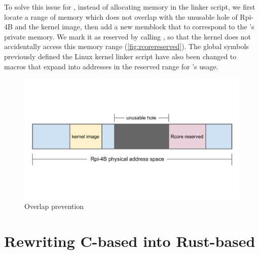 To solve this issue for \rustsec{}, instead of allocating memory in the linker
script, we first locate a range of memory which does not overlap with the
unusable hole of Rpi-4B and the kernel image, then add a new memblock that to
correspond to the \rustcore{}'s private memory. We mark it as reserved by
calling , so that the kernel does not accidentally
access this memory range (\autoref{fig:rcorereserved}).
The global symbols previously defined the Linux kernel linker script have also
been changed to macros that expand into addresses in the reserved range for
\rustsec{}'s \rustcore{} usage.

\begin{figure}[H]
    \includegraphics[scale=0.60]{figures/rcore_reserved.pdf}
    \caption{Overlap prevention}
    \label{fig:rcorereserved}
\end{figure}

\section{Rewriting C-based \secore{} into Rust-based \rustcore{}}

%

